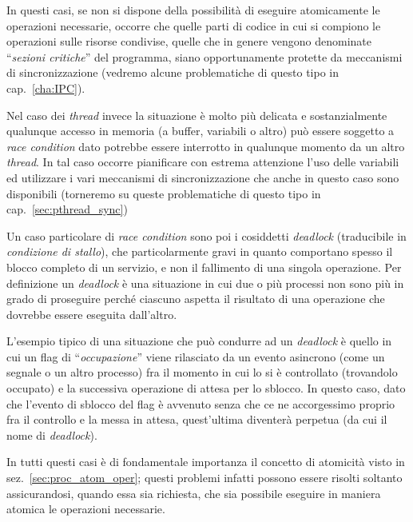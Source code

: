 In questi casi, se non si dispone della possibilità di eseguire atomicamente
le operazioni necessarie, occorre che quelle parti di codice in cui si
compiono le operazioni sulle risorse condivise, quelle che in genere vengono
denominate ``\textsl{sezioni critiche}'' del programma, siano opportunamente
protette da meccanismi di sincronizzazione (vedremo alcune problematiche di
questo tipo in cap.~\ref{cha:IPC}).


Nel caso dei \textit{thread} invece la situazione è molto più delicata e
sostanzialmente qualunque accesso in memoria (a buffer, variabili o altro) può
essere soggetto a \textit{race condition} dato potrebbe essere interrotto in
qualunque momento da un altro \textit{thread}. In tal caso occorre pianificare
con estrema attenzione l'uso delle variabili ed utilizzare i vari meccanismi
di sincronizzazione che anche in questo caso sono disponibili (torneremo su
queste problematiche di questo tipo in cap.~\ref{sec:pthread_sync})


Un caso particolare di \textit{race condition} sono poi i cosiddetti
\textit{deadlock} (traducibile in \textsl{condizione di stallo}), che
particolarmente gravi in quanto comportano spesso il blocco completo di un
servizio, e non il fallimento di una singola operazione. Per definizione un
\textit{deadlock} è una situazione in cui due o più processi non sono più in
grado di proseguire perché ciascuno aspetta il risultato di una operazione che
dovrebbe essere eseguita dall'altro.

L'esempio tipico di una situazione che può condurre ad un
\textit{deadlock} è quello in cui un flag di
``\textsl{occupazione}'' viene rilasciato da un evento asincrono (come un
segnale o un altro processo) fra il momento in cui lo si è controllato
(trovandolo occupato) e la successiva operazione di attesa per lo sblocco. In
questo caso, dato che l'evento di sblocco del flag è avvenuto senza che ce ne
accorgessimo proprio fra il controllo e la messa in attesa, quest'ultima
diventerà perpetua (da cui il nome di \textit{deadlock}).

In tutti questi casi è di fondamentale importanza il concetto di atomicità
visto in sez.~\ref{sec:proc_atom_oper}; questi problemi infatti possono essere
risolti soltanto assicurandosi, quando essa sia richiesta, che sia possibile
eseguire in maniera atomica le operazioni necessarie.



